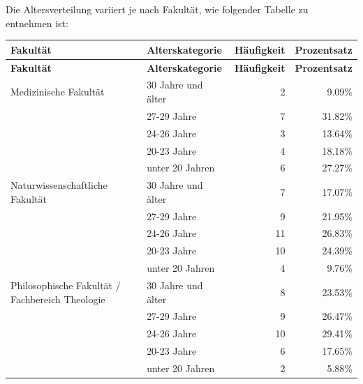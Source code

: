 \documentclass[german,report]{i1thesis}
\begin{document}
Die Altersverteilung variiert je nach Fakultät, wie folgender Tabelle zu entnehmen ist:

\begin{longtable}{|p{5.95cm}|l|r|r|}
\hline
\textbf{Fakultät} & \textbf{Alterskategorie} & \textbf{Häufigkeit} & \textbf{Prozentsatz} \\ \hline
\endfirsthead
\hline
\textbf{Fakultät} & \textbf{Alterskategorie} & \textbf{Häufigkeit} & \textbf{Prozentsatz} \\ \hline
\endhead
\hline
\endfoot
\endlastfoot
Medizinische Fakultät                           & 30 Jahre und älter & 2  & 9.09\% \\ \cline{2-4}
                                                & 27-29 Jahre        & 7  & 31.82\% \\ \cline{2-4}
                                                & 24-26 Jahre        & 3  & 13.64\% \\ \cline{2-4}
                                                & 20-23 Jahre        & 4  & 18.18\% \\ \cline{2-4}
                                                & unter 20 Jahren    & 6  & 27.27\% \\ \hline
Naturwissenschaftliche Fakultät                 & 30 Jahre und älter & 7  & 17.07\% \\ \cline{2-4}
                                                & 27-29 Jahre        & 9  & 21.95\% \\ \cline{2-4}
                                                & 24-26 Jahre        & 11 & 26.83\% \\ \cline{2-4}
                                                & 20-23 Jahre        & 10 & 24.39\% \\ \cline{2-4}
                                                & unter 20 Jahren    & 4  & 9.76\% \\ \hline
\makecell[l]{Philosophische Fakultät / \\ Fachbereich Theologie} & 30 Jahre und älter & 8  & 23.53\% \\ \cline{2-4}
                                                & 27-29 Jahre        & 9  & 26.47\% \\ \cline{2-4}
                                                & 24-26 Jahre        & 10 & 29.41\% \\ \cline{2-4}
                                                & 20-23 Jahre        & 6  & 17.65\% \\ \cline{2-4}
                                                & unter 20 Jahren    & 2  & 5.88\% \\ \hline

\end{longtable}
\end{document}
